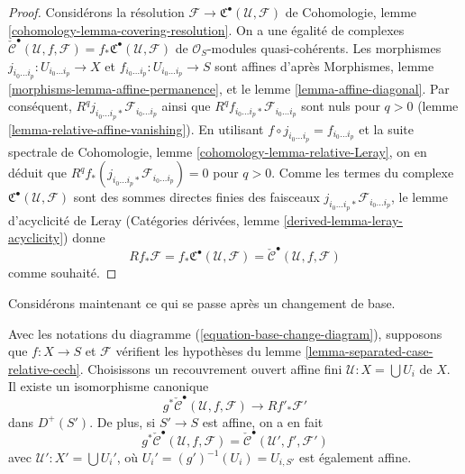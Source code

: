 \begin{proof}
Considérons la résolution
$\mathcal{F} \to {\mathfrak C}^\bullet(\mathcal{U}, \mathcal{F})$
de Cohomologie, lemme \ref{cohomology-lemma-covering-resolution}.
On a une égalité de complexes
$\check{\mathcal{C}}^\bullet(\mathcal{U}, f, \mathcal{F}) =
f_*{\mathfrak C}^\bullet(\mathcal{U}, \mathcal{F})$
de $\mathcal{O}_S$-modules
quasi-cohérents. Les morphismes $j_{i_0 \ldots i_p} : U_{i_0 \ldots i_p} \to X$
et $f_{i_0 \ldots i_p} : U_{i_0 \ldots i_p} \to S$
sont affines d'après Morphismes, lemme \ref{morphisms-lemma-affine-permanence},
et le lemme \ref{lemma-affine-diagonal}. Par
conséquent, $R^qj_{i_0 \ldots i_p *}\mathcal{F}_{i_0 \ldots i_p}$
ainsi que $R^qf_{i_0 \ldots i_p *}\mathcal{F}_{i_0 \ldots i_p}$
sont nuls pour $q > 0$ (lemme \ref{lemma-relative-affine-vanishing}). En
utilisant $f \circ j_{i_0 \ldots i_p} = f_{i_0 \ldots i_p}$ et
la suite spectrale de
Cohomologie, lemme \ref{cohomology-lemma-relative-Leray},
on en déduit que
$R^qf_*(j_{i_0 \ldots i_p *}\mathcal{F}_{i_0 \ldots i_p}) = 0$
pour $q > 0$.
Comme les termes du complexe
${\mathfrak C}^\bullet(\mathcal{U}, \mathcal{F})$ sont des sommes
directes finies des faisceaux $j_{i_0 \ldots i_p *}\mathcal{F}_{i_0 \ldots i_p}$,
le lemme d'acyclicité de Leray
(Catégories dérivées, lemme \ref{derived-lemma-leray-acyclicity})
donne
$$
Rf_* \mathcal{F} = f_*{\mathfrak C}^\bullet(\mathcal{U}, \mathcal{F}) =
\check{\mathcal{C}}^\bullet(\mathcal{U}, f, \mathcal{F})
$$
comme souhaité.
\end{proof}

\noindent
Considérons maintenant ce qui se passe après un changement de base.

\begin{lemma}
\label{lemma-base-change-complex}
Avec les notations du diagramme (\ref{equation-base-change-diagram}), supposons
que $f : X \to S$ et $\mathcal{F}$ vérifient les hypothèses du
lemme \ref{lemma-separated-case-relative-cech}. Choisissons un recouvrement
ouvert affine fini $\mathcal{U} : X = \bigcup U_i$ de $X$.
Il existe un isomorphisme canonique
$$
g^*\check{\mathcal{C}}^\bullet(\mathcal{U}, f, \mathcal{F})
\longrightarrow
Rf'_*\mathcal{F}'
$$
dans $D^{+}(S')$. De plus, si $S' \to S$ est affine, on a en fait
$$
g^*\check{\mathcal{C}}^\bullet(\mathcal{U}, f, \mathcal{F})
=
\check{\mathcal{C}}^\bullet(\mathcal{U}', f', \mathcal{F}')
$$
avec $\mathcal{U}' : X' = \bigcup U_i'$, où
$U_i' = (g')^{-1}(U_i) = U_{i, S'}$ est également affine.
\end{lemma}

